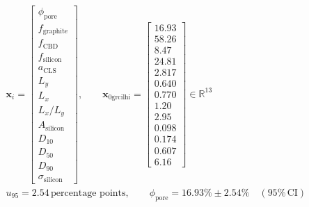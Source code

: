 \documentclass[border=12pt]{standalone}
\begin{document}
$\displaystyle
\begin{gathered}
\mathbf{x}_i=\begin{bmatrix}\phi_{\mathrm{pore}} \\ f_{\mathrm{graphite}} \\ f_{\mathrm{CBD}} \\ f_{\mathrm{silicon}} \\ a_{\mathrm{CLS}} \\ L_y \\ L_x \\ L_x/L_y \\ A_{\mathrm{silicon}} \\ D_{10} \\ D_{50} \\ D_{90} \\ \sigma_{\mathrm{silicon}}\end{bmatrix},\qquad\mathbf{x}_{\mathrm{0grcilhi}}=\begin{bmatrix}16.93 \\ 58.26 \\ 8.47 \\ 24.81 \\ 2.817 \\ 0.640 \\ 0.770 \\ 1.20 \\ 2.95 \\ 0.098 \\ 0.174 \\ 0.607 \\ 6.16\end{bmatrix}\in\mathbb{R}^{13}
\\[18pt]
u_{95}=2.54\,\text{percentage points},\qquad
\phi_{\mathrm{pore}}=16.93\%\pm2.54\%\quad(95\%\,\mathrm{CI})
\end{gathered}
$
\end{document}
